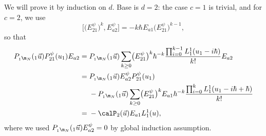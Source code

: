 	We will prove it by induction on $d$. Base is $d=2$: the case $c=1$ is trivial, and for $c=2$, we use
	\[
	\bigl[\bigl(E_{21}^{\psi}\bigr)^k,E_{a2}^{\psi}\bigr] = -k\hbar E_{a1} \bigl(E_{21}^{\psi}\bigr)^{k-1},
	\]
	so that
	\begin{align*}
		P_{{}_1\m_N}({}_1\vec{u}) P_{21}^{\psi}(u_1) E_{a2}
		={}& P_{{}_1\m_N}({}_1\vec{u})\sum\limits_{k\geq 0} \bigl(E_{21}^{\psi}\bigr)^k \hbar^{-k} \frac{\prod_{i=0}^{k-1} L_1^1(u_1 - i\hbar)}{k!} E_{a2} \\
		={}&P_{{}_1\m_N}({}_1\vec{u}) E_{a2}^{\psi} P_{21}^{\psi}(u_1) \\
		&- P_{{}_1\m_N}({}_1\vec{u}) \sum\limits_{k\geq 0} \bigl(E_{21}^{\psi}\bigr)^k E_{a1} \hbar^{-k} \frac{\prod_{i=0}^{k}L_1^1(u_1 - i\hbar + \hbar)}{k!} \\
		={}& -\calP_2(\vec{u}) E_{a1} L_1^1(u),
	\end{align*}
	where we used $P_{{}_1\m_N}({}_1\vec{u}) E_{a2}^{\psi} = 0$ by global induction assumption.
	

